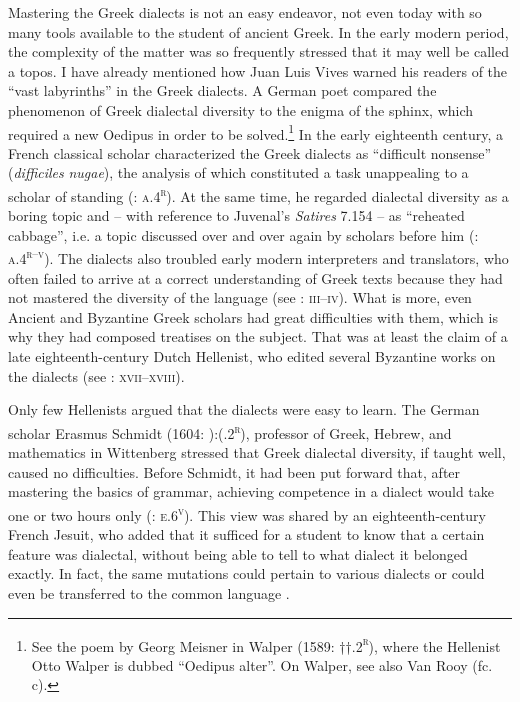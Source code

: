 Mastering the Greek dialects is not an easy endeavor, not even today with so many tools available to the student of ancient Greek. In the early modern period, the complexity of the matter was so frequently stressed that it may well be called a topos. I have already mentioned how Juan Luis Vives warned his readers of the “vast labyrinths” in the Greek dialects. A German poet compared the phenomenon of Greek dialectal diversity to the enigma of the sphinx, which required a new Oedipus in order to be solved.\footnote{See the poem by Georg Meisner in Walper (1589: ††.2\textsc{\textsuperscript{r}}), where the Hellenist Otto Walper is dubbed “Oedipus alter”. On Walper, see also Van Rooy (fc. c).} In the early eighteenth century, a French classical scholar characterized the Greek dialects as “difficult nonsense” (\textit{difficiles} \textit{nugae}), the analysis of which constituted a task unappealing to a scholar of standing (\citealt{Maittaire1706}: \textsc{a.4}\textsc{\textsuperscript{r}}). At the same time, he regarded dialectal diversity as a boring topic and – with reference to Juvenal’s \textit{Satires} 7.154 – as “reheated cabbage”, i.e. a topic discussed over and over again by scholars before him (\citealt{Maittaire1706}: \textsc{a.4}\textsc{\textsuperscript{r–v}}). The dialects also troubled early modern interpreters and translators, who often failed to arrive at a correct understanding of Greek texts because they had not mastered the diversity of the language (see \citealt{Facius1782}: \textsc{iii–iv}). What is more, even Ancient and Byzantine Greek scholars had great difficulties with them, which is why they had composed treatises on the subject. That was at least the claim of a late eighteenth-century Dutch Hellenist, who edited several Byzantine works on the dialects (see \citealt{Koen1766}: \textsc{xvii–xviii}).

Only few Hellenists argued that the dialects were easy to learn. The German scholar Erasmus Schmidt (1604: ):(.2\textsc{\textsuperscript{r}}), professor of Greek, Hebrew, and mathematics in Wittenberg stressed that Greek dialectal diversity, if taught well, caused no difficulties. Before Schmidt, it had been put forward that, after mastering the basics of grammar, achieving competence in a dialect would take one or two hours only (\citealt{Caselius1560}: \textsc{e.6}\textsc{\textsuperscript{v}}). This view was shared by an eighteenth-century French Jesuit, who added that it sufficed for a student to know that a certain feature was dialectal, without being able to tell to what dialect it belonged exactly. In fact, the same mutations could pertain to various dialects or could even be transferred to the common language \citep[101]{Giraudeau1739}.

